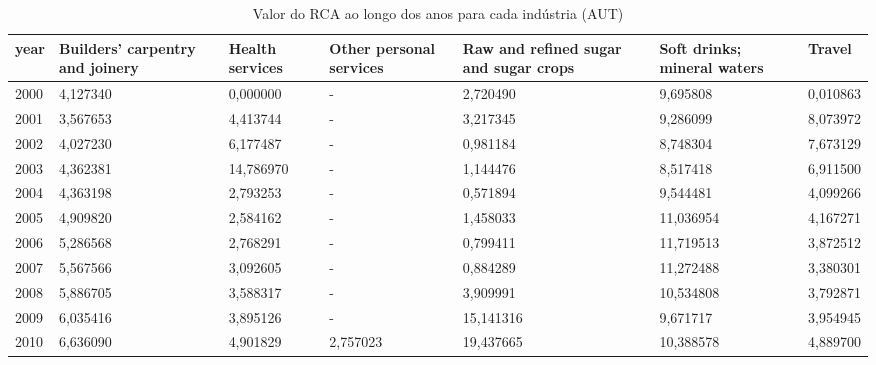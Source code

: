 \begin{table}
\centering
\caption{Valor do RCA ao longo dos anos para cada indústria (AUT)}
\begin{tabular}{p{1cm}p{2cm}p{2cm}p{2cm}p{2cm}p{2cm}p{2cm}}
\toprule
 year &  Builders' carpentry and joinery &  Health services &  Other personal services &  Raw and refined sugar and sugar crops &  Soft drinks; mineral waters &   Travel \\
\midrule
 2000 &                         4,127340 &         0,000000 &                        - &                               2,720490 &                     9,695808 & 0,010863 \\
 2001 &                         3,567653 &         4,413744 &                        - &                               3,217345 &                     9,286099 & 8,073972 \\
 2002 &                         4,027230 &         6,177487 &                        - &                               0,981184 &                     8,748304 & 7,673129 \\
 2003 &                         4,362381 &        14,786970 &                        - &                               1,144476 &                     8,517418 & 6,911500 \\
 2004 &                         4,363198 &         2,793253 &                        - &                               0,571894 &                     9,544481 & 4,099266 \\
 2005 &                         4,909820 &         2,584162 &                        - &                               1,458033 &                    11,036954 & 4,167271 \\
 2006 &                         5,286568 &         2,768291 &                        - &                               0,799411 &                    11,719513 & 3,872512 \\
 2007 &                         5,567566 &         3,092605 &                        - &                               0,884289 &                    11,272488 & 3,380301 \\
 2008 &                         5,886705 &         3,588317 &                        - &                               3,909991 &                    10,534808 & 3,792871 \\
 2009 &                         6,035416 &         3,895126 &                        - &                              15,141316 &                     9,671717 & 3,954945 \\
 2010 &                         6,636090 &         4,901829 &                 2,757023 &                              19,437665 &                    10,388578 & 4,889700 \\

\end{tabular}
\end{table}
